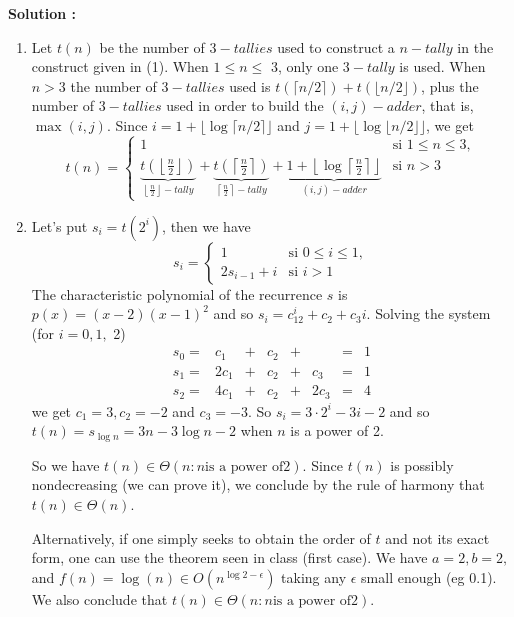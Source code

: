 \documentclass[11pt]{article} %
\newenvironment{solution}[1][\unskip]{%
	\par
	\noindent
	\textbf{Solution #1:}
	\noindent}
{\medskip}
\begin{document}
\begin{solution}
\begin{enumerate}
		\item {Let $ t (n) $ be the number of $ 3-tallies $ used to construct a $ n-tally $ in the construct given in (1). When $ 1 \leq n \leq $ 3, only one $ 3-tally $ is used. When $ n> 3 $ the number of $ 3-tallies $ used is $ t (\lceil n / 2 \rceil) + t (\lfloor n / 2 \rfloor) $, plus the number of $ 3-tallies $ used in order to build the $ (i, j) -adder $, that is, $ \max (i, j) $. Since $ i = 1 + \lfloor \log \lceil n / 2 \rceil \rfloor $ and $ j = 1 + \lfloor \log \lfloor n / 2 \rfloor \rfloor $, we get
				\begin{equation}
				t(n)=\left\{
				\begin{array}{ll}
				1 & \text{si } 1\leq n \leq 3,\\\underbrace{t(\left\lfloor\frac{n}{2}\right\rfloor)}_{\left\lfloor\frac{n}{2}\right\rfloor -tally}+
				\underbrace{t(\left\lceil\frac{n}{2}\right\rceil)}_{\left\lceil\frac{n}{2}\right\rceil -tally}+  \underbrace{1 + \left\lfloor \log \left\lceil \frac{n}{2} \right\rceil \right\rfloor}_{(i,j)-adder} & \text{si } n> 3
				\end{array} \right.
				\end{equation}}
			\item{Let's put $ s_i = t (2 ^ i) $, then we have
				\begin{equation*}
				s_i=\left\{
				\begin{array}{ll}
				1 & \text{si } 0\leq i \leq 1,\\
				2s_{i-1} + i & \text{si } i>1
				\end{array} \right.
				\end{equation*}
				The characteristic polynomial of the recurrence $ s $ is $ p (x) = (x-2) (x-1) ^ 2 $ and so $ s_i = c_12 ^ i + c_2 + c_3 i $. Solving the system (for $ i = 0, 1, $ 2)
				\begin{equation*}
				\begin{array}{llllllll}
				s_0 =& c_1 & + & c_2 & + & & = & 1\\
				s_1 =& 2c_1 & + & c_2 & + & c_3 & = & 1\\
				s_2 =& 4c_1 & + & c_2 & + & 2c_3 & = & 4
				\end{array}
				\end{equation*}
				we get $ c_1 = 3, c_2 = -2 $ and $ c_3 = -3 $. So $ s_i = 3 \cdot 2 ^ i - 3i -2 $ and so $ t (n) = s _ {\log n} = 3n - 3 \log n -2 $ when $ n $ is a power of 2.

				So we have $ t (n) \in \Theta (n: n \text {is a power of} 2) $. Since $ t (n) $ is possibly nondecreasing (we can prove it), we conclude by the rule of harmony that $ t (n) \in \Theta (n) $.

				Alternatively, if one simply seeks to obtain the order of $ t $ and not its exact form, one can use the theorem seen in class (first case). We have $ a = 2, b = 2, $ and $ f (n) = \log (n) \in O (n ^ {\log 2 - \epsilon}) $ taking any $ \epsilon $ small enough (eg 0.1). We also conclude that $ t (n) \in \Theta (n: n \text {is a power of} 2) $.
			}
		\end{enumerate}
	\end{solution}
\end{document}
